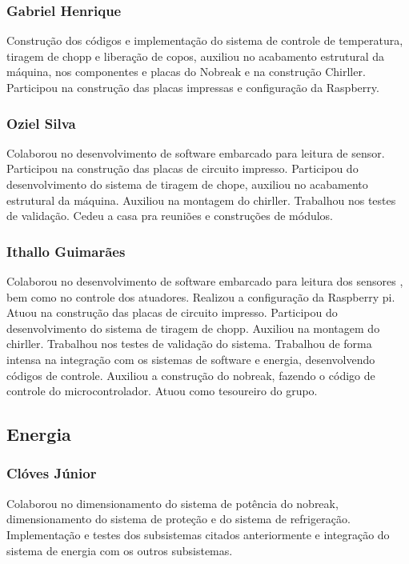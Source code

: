 \begin{apendicesenv}
\subsubsection{Gabriel Henrique}

Construção dos códigos e implementação do sistema de controle de temperatura,
tiragem de chopp e liberação de copos, auxiliou no acabamento estrutural da máquina,
nos componentes e placas do Nobreak e na construção Chirller. Participou na construção
das placas impressas e configuração da Raspberry.

\subsubsection{Oziel Silva}

Colaborou no desenvolvimento de software embarcado para leitura de sensor. 
Participou na construção das placas de circuito impresso. 
Participou do desenvolvimento do sistema de tiragem de chope, 
auxiliou no acabamento estrutural da máquina. Auxiliou na montagem do chirller. 
Trabalhou nos testes de validação. Cedeu a casa pra reuniões e construções de módulos.

\subsubsection{Ithallo Guimarães}

Colaborou no desenvolvimento de software embarcado para leitura dos sensores , bem como no controle dos atuadores.  
Realizou a configuração da Raspberry pi. Atuou na construção das placas de circuito impresso. 
Participou do desenvolvimento do sistema de tiragem de chopp. 
Auxiliou na montagem do chirller. 
Trabalhou nos testes de validação do sistema.
Trabalhou de forma intensa na integração com os sistemas de software e energia, desenvolvendo códigos de controle.
Auxiliou a construção do nobreak, fazendo o código de controle do microcontrolador.
Atuou como tesoureiro do grupo.

\subsection{Energia}

\subsubsection{Clóves Júnior}

Colaborou no dimensionamento do sistema de potência do nobreak, dimensionamento do sistema de proteção e
do sistema de refrigeração. Implementação e testes dos subsistemas citados anteriormente e integração do
sistema de energia com os outros subsistemas.


\end{apendicesenv}
